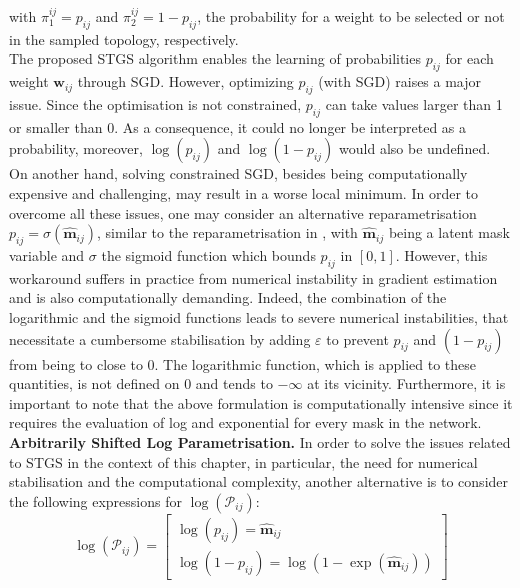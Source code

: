 with $\pi^{ij}_1 = p_{ij}$ and $\pi^{ij}_2 = 1-p_{ij}$, the probability for a
weight to be selected or not in the sampled topology, respectively.\\

The proposed \ac{STGS} algorithm enables the learning of probabilities
$p_{ij}$ for each weight $\bm{w}_{ij}$ through \ac{SGD}. However, optimizing
$p_{ij}$ (with \ac{SGD}) raises a major issue. Since the optimisation is not
constrained, $p_{ij}$ can take values larger than 1 or smaller than 0. As a
consequence, it could no longer be interpreted as a probability, moreover,
$\log(p_{ij})$ and $\log(1-p_{ij})$ would also be undefined.\\

On another hand, solving constrained SGD, besides being computationally
expensive and challenging, may result in a worse local minimum. In order to
overcome all these issues, one may consider an alternative reparametrisation
$p_{ij}=\sigma(\bm{\hat{m}}_{ij})$, similar to the reparametrisation in
\cite{DBLP:conf/nips/ZhouLLY19}, with $\bm{\hat{m}}_{ij}$ being a latent mask
variable and $\sigma$ the sigmoid function which bounds $p_{ij}$ in $[0,1]$.
However, this workaround suffers in practice from numerical instability in
gradient estimation and is also computationally demanding. Indeed, the
combination of the logarithmic and the sigmoid functions leads to severe
numerical instabilities, that necessitate a cumbersome stabilisation by adding
$\varepsilon$ to prevent $p_{ij}$ and $(1-p_{ij})$ from being to close to 0. The
logarithmic function, which is applied to these quantities, is not defined on 0
and tends to $-\infty$ at its vicinity. Furthermore, it is important to note
that the above formulation is computationally intensive since it requires the
evaluation of log and exponential for every mask in the network.\\


\noindent\textbf{Arbitrarily Shifted Log Parametrisation.} In order to solve the
issues related to \ac{STGS} in the context of this chapter, in particular, the
need for numerical stabilisation and the computational complexity, another
alternative is to consider the following expressions for
$\log(\mathcal{P}_{ij})$:\\

\begin{equation}
  \label{eqn:chap2:log-probabilities}
  \log(\mathcal{P}_{ij}) =
  \begin{bmatrix}
    \log(p_{ij}) = \bm{\hat{m}}_{ij} \\
    \log(1-p_{ij}) = \log(1-\exp(\bm{\hat{m}}_{ij}))
  \end{bmatrix}
\end{equation}\\

